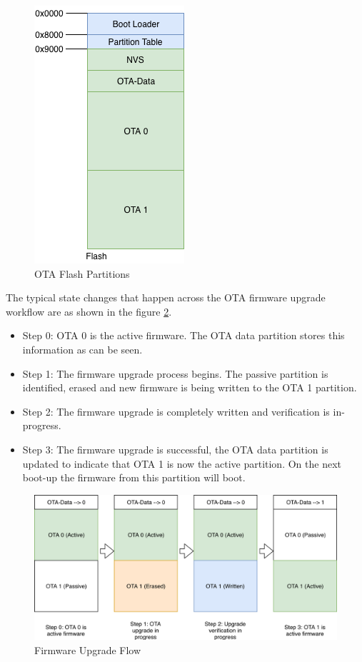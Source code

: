 \documentclass[main.tex]{subfiles}
\begin{document}
\begin{figure}[h!]
    \centering
    \includegraphics{../../_static/flash_partitions_upgrade.png}
    \caption{OTA Flash Partitions}
    \label{fig:ota_flash_parts}
\end{figure}

The typical state changes that happen across the OTA firmware upgrade workflow are as shown in the figure \ref{fig:ota_workflow}.
\begin{itemize}
    \item Step 0: OTA 0 is the active firmware. The OTA data partition stores this information as can be seen.
    \item Step 1: The firmware upgrade process begins. The passive partition is identified, erased and new firmware is being written to the OTA 1 partition.
    \item Step 2: The firmware upgrade is completely written and verification is in-progress.
    \item Step 3: The firmware upgrade is successful, the OTA data partition is updated to indicate that OTA 1 is now the active partition. On the next boot-up the firmware from this partition will boot.
\end{itemize}

\begin{figure}[h!]
    \centering
    \includegraphics[scale=0.4]{../../_static/upgrade_flow.png}
    \caption{Firmware Upgrade Flow}
    \label{fig:ota_workflow}
\end{figure}
\end{document}
